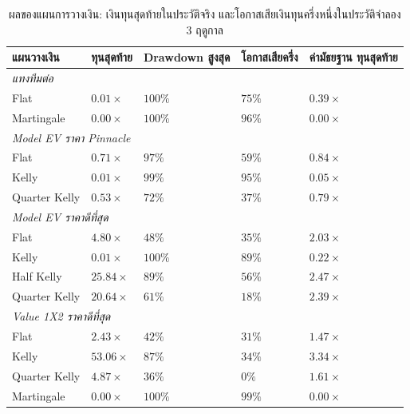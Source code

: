 \begin{table}[htbp]
\centering
\caption{ผลของแผนการวางเงิน: เงินทุนสุดท้ายในประวัติจริง และโอกาสเสียเงินทุนครึ่งหนึ่งในประวัติจำลอง 3 ฤดูกาล}
\label{tab:staking}
\small
\begin{tabular}{|p{3.0cm}|>{\centering\arraybackslash}p{2.0cm}|>{\centering\arraybackslash}p{2.2cm}|>{\centering\arraybackslash}p{2.2cm}|>{\centering\arraybackslash}p{2.6cm}|}
\hline
\textbf{แผนวางเงิน} & \textbf{ทุนสุดท้าย} & \textbf{Drawdown สูงสุด} & \textbf{โอกาสเสียครึ่ง} & \textbf{ค่ามัธยฐาน ทุนสุดท้าย} \\
\hline
\multicolumn{5}{|l|}{\textit{แทงทีมต่อ}} \\
\hline
Flat & $0.01\times$ & $100\%$ & $75\%$ & $0.39\times$ \\
Martingale & $0.00\times$ & $100\%$ & $96\%$ & $0.00\times$ \\
\hline
\multicolumn{5}{|l|}{\textit{Model EV ราคา Pinnacle}} \\
\hline
Flat & $0.71\times$ & $97\%$ & $59\%$ & $0.84\times$ \\
Kelly & $0.01\times$ & $99\%$ & $95\%$ & $0.05\times$ \\
Quarter Kelly & $0.53\times$ & $72\%$ & $37\%$ & $0.79\times$ \\
\hline
\multicolumn{5}{|l|}{\textit{Model EV ราคาดีที่สุด}} \\
\hline
Flat & $4.80\times$ & $48\%$ & $35\%$ & $2.03\times$ \\
Kelly & $0.01\times$ & $100\%$ & $89\%$ & $0.22\times$ \\
Half Kelly & $25.84\times$ & $89\%$ & $56\%$ & $2.47\times$ \\
Quarter Kelly & $20.64\times$ & $61\%$ & $18\%$ & $2.39\times$ \\
\hline
\multicolumn{5}{|l|}{\textit{Value 1X2 ราคาดีที่สุด}} \\
\hline
Flat & $2.43\times$ & $42\%$ & $31\%$ & $1.47\times$ \\
Kelly & $53.06\times$ & $87\%$ & $34\%$ & $3.34\times$ \\
Quarter Kelly & $4.87\times$ & $36\%$ & $0\%$ & $1.61\times$ \\
Martingale & $0.00\times$ & $100\%$ & $99\%$ & $0.00\times$ \\
\hline
\end{tabular}
\end{table}

